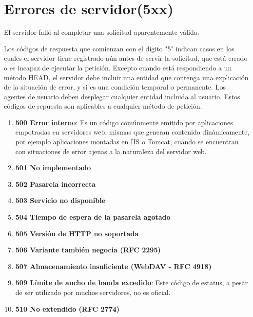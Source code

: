 \section{Errores de servidor(5xx)}
El servidor falló al completar una solicitud aparentemente válida.
\bigskip
\par
Los códigos de respuesta que comienzan con el dígito "5" indican casos en los cuales el servidor tiene registrado aún antes de servir la solicitud, que está errado o es incapaz de ejecutar la petición. Excepto cuando está respondiendo a un método HEAD, el servidor debe incluir una entidad que contenga una explicación de la situación de error, y si es una condición temporal o permanente. Los agentes de usuario deben desplegar cualquier entidad incluida al usuario. Estos códigos de repuesta son aplicables a cualquier método de petición.
\bigskip
\par
\begin{enumerate}
\item \textbf{500 Error interno}: Es un código comúnmente emitido por aplicaciones empotradas en servidores web, mismas que generan contenido dinámicamente, por ejemplo aplicaciones montadas en IIS o Tomcat, cuando se encuentran con situaciones de error ajenas a la naturaleza del servidor web.
\item \textbf{501 No implementado}
\item \textbf{502 Pasarela incorrecta}
\item \textbf{503 Servicio no disponible}
\item \textbf{504 Tiempo de espera de la pasarela agotado}
\item \textbf{505 Versión de HTTP no soportada}
\item \textbf{506 Variante también negocia (RFC 2295)}
\item \textbf{507 Almacenamiento insuficiente (WebDAV - RFC 4918)}
\item \textbf{509 Límite de ancho de banda excedido}: Este código de estatus, a pesar de ser utilizado por muchos servidores, no es oficial.
\item \textbf{510 No extendido (RFC 2774)}
\end{enumerate}
